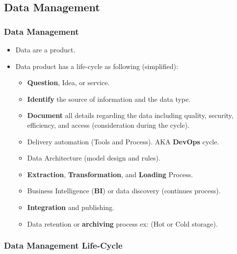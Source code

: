 
\subsection{Data Management}

\begin{frame}
\frametitle{Data Management}

\begin{itemize}[<+->]
\item Data are a product.
\item Data product has a life-cycle as following (simplified):
\begin{itemize}[<+->]
	\item \textbf{Question}, Idea, or service.
	\item \textbf{Identify} the source of information and the data type.
	\item \textbf{Document} all details regarding the data including quality, security, efficiency, and access (consideration during the cycle).
	\item Delivery automation (Tools and Process). AKA \textbf{DevOps} cycle.
	\item Data Architecture (model design and rules).
	\item \textbf{Extraction}, \textbf{Transformation}, and \textbf{Loading} Process.
	\item Business Intelligence (\textbf{BI}) or data discovery (continues process).
	\item \textbf{Integration} and publishing.
	\item Data retention or \textbf{archiving} process ex: (Hot or Cold storage).
\end{itemize}
\end{itemize}

\end{frame}


\begin{frame}
\frametitle{Data Management Life-Cycle}
\end{frame}

